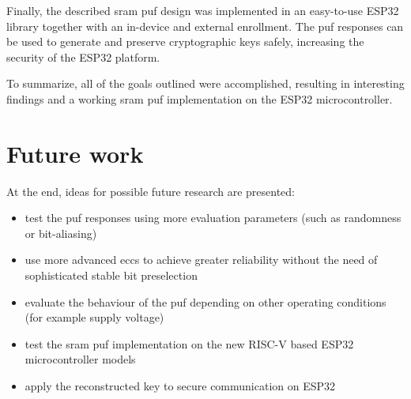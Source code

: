 Finally, the described \gls{sram} \gls{puf} design was implemented in an easy-to-use ESP32 library together with an in-device and external enrollment. The \gls{puf} responses can be used to generate and preserve cryptographic keys safely, increasing the security of the ESP32 platform.

To summarize, all of the goals outlined were accomplished, resulting in interesting findings and a working \gls{sram} \gls{puf} implementation on the ESP32 microcontroller.

\pagebreak

\section*{Future work}
{}

At the end, ideas for possible future research are presented:
\begin{itemize}
    \item test the \gls{puf} responses using more evaluation parameters (such as randomness or bit-aliasing)
    \item use more advanced \glspl{ecc} to achieve greater reliability without the need of sophisticated stable bit preselection
    \item evaluate the behaviour of the \gls{puf} depending on other operating conditions (for example supply voltage)
    \item test the \gls{sram} \gls{puf} implementation on the new RISC-V based ESP32 microcontroller models
    \item apply the reconstructed key to secure communication on ESP32
\end{itemize}


